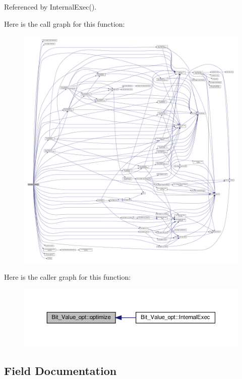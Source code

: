 Referenced by Internal\+Exec().

Here is the call graph for this function\+:
\nopagebreak
\begin{figure}[H]
\begin{center}
\leavevmode
\includegraphics[width=350pt]{dc/d5b/classBit__Value__opt_a82c083d2a6a103f4dff51656736635ae_cgraph}
\end{center}
\end{figure}
Here is the caller graph for this function\+:
\nopagebreak
\begin{figure}[H]
\begin{center}
\leavevmode
\includegraphics[width=350pt]{dc/d5b/classBit__Value__opt_a82c083d2a6a103f4dff51656736635ae_icgraph}
\end{center}
\end{figure}


\subsection{Field Documentation}
\mbox{\label{classBit__Value__opt_a0eaee0b09dbea61b2aab964500f109a1}} 
